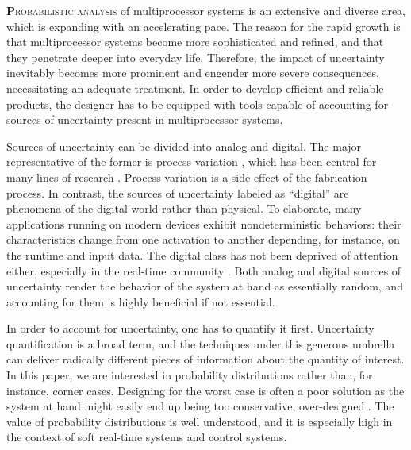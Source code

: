\lettrine[findent=0.4em, nindent=0em]{\textbf{P}}{robabilistic analysis} of
multiprocessor systems is an extensive and diverse area, which is expanding with
an accelerating pace. The reason for the rapid growth is that multiprocessor
systems become more sophisticated and refined, and that they penetrate deeper
into everyday life. Therefore, the impact of uncertainty inevitably becomes more
prominent and engender more severe consequences, necessitating an adequate
treatment. In order to develop efficient and reliable products, the designer has
to be equipped with tools capable of accounting for sources of uncertainty
present in multiprocessor systems.

Sources of uncertainty can be divided into analog and digital. The major
representative of the former is process variation \cite{srivastava2005}, which
has been central for many lines of research \cite{bhardwaj2008, juan2012,
lee2013, ukhov2014, ukhov2015}. Process variation is a side effect of the
fabrication process. In contrast, the sources of uncertainty labeled as
``digital'' are phenomena of the digital world rather than physical. To
elaborate, many applications running on modern devices exhibit nondeterministic
behaviors: their characteristics change from one activation to another
depending, for instance, on the runtime and input data. The digital class has
not been deprived of attention either, especially in the real-time community
\cite{diaz2002, quinton2012, tanasa2015}. Both analog and digital sources of
uncertainty render the behavior of the system at hand as essentially random, and
accounting for them is highly beneficial if not essential.

In order to account for uncertainty, one has to quantify it first. Uncertainty
quantification is a broad term, and the techniques under this generous umbrella
can deliver radically different pieces of information about the quantity of
interest. In this paper, we are interested in probability distributions rather
than, for instance, corner cases. Designing for the worst case is often a poor
solution as the system at hand might easily end up being too conservative,
over-designed \cite{quinton2012}. The value of probability distributions is well
understood, and it is especially high in the context of soft real-time systems
and control systems.

